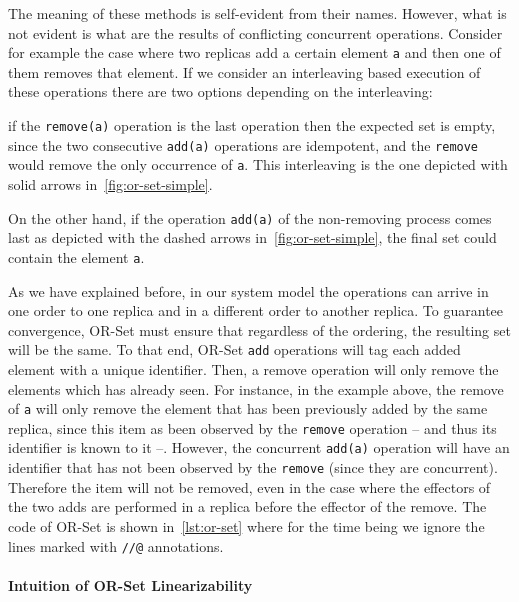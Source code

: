 The meaning of these methods is self-evident from their names.
%
However, what is not evident is what are the results of conflicting
concurrent operations.
%
Consider for example the case where two replicas add a certain element
\lstinline|a| and then one of them removes that element.
%
If we consider an interleaving based execution of these operations
there are two options depending on the interleaving:
\begin{inparaenum}[i)]
\item if the \lstinline|remove(a)| operation is the last operation
  then the expected set is empty, since the two consecutive
  \lstinline|add(a)| operations are idempotent, and the
  \lstinline|remove| would remove the only occurrence of
  \lstinline|a|. This interleaving is the one depicted with solid
  arrows in~\autoref{fig:or-set-simple}.
\item On the other hand, if the operation \lstinline|add(a)| of the
  non-removing process comes last as depicted with the dashed arrows
  in~\autoref{fig:or-set-simple}, the final set could contain the
  element \lstinline|a|.
\end{inparaenum}
As we have explained before, in our system model the operations can
arrive in one order to one replica and in a different order to another
replica.
%
To guarantee convergence, OR-Set must ensure that regardless of the
ordering, the resulting set will be the same.
%
To that end, OR-Set \lstinline|add| operations will tag each added
element with a unique identifier.
%
Then, a remove operation will only remove the elements which has
already seen.
%
For instance, in the example above, the remove of \lstinline|a| will
only remove the element that has been previously added by the same
replica, since this item as been observed by the \lstinline|remove|
operation -- and thus its identifier is known to it --. However, the
concurrent \lstinline|add(a)| operation will have an identifier that
has not been observed by the \lstinline|remove| (since they are
concurrent).
%
Therefore the item will not be removed, even in the case where the
effectors of the two adds are performed in a replica before the effector
of the remove.
%
The code of OR-Set is shown in~\autoref{lst:or-set} where for the time
being we ignore the lines marked with \lstinline|//@| annotations.


\paragraph{Intuition of OR-Set Linearizability}

